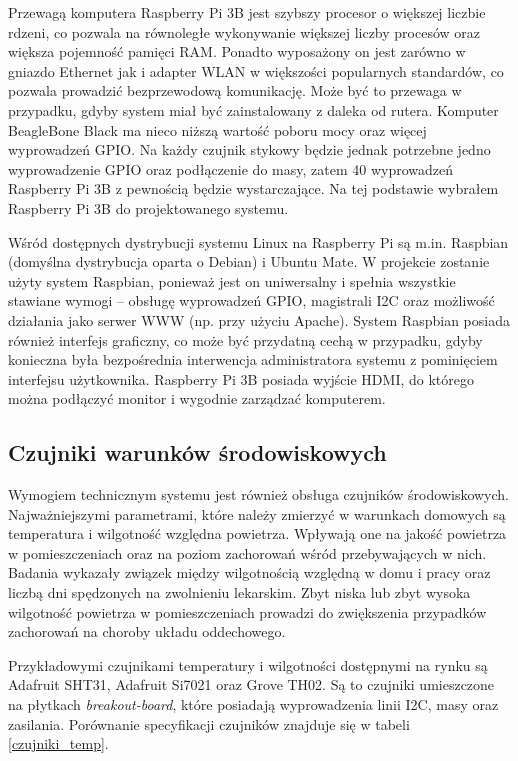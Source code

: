 \documentclass[a4paper,12pt,twoside]{article}
\begin{document}
Przewagą komputera Raspberry Pi 3B jest szybszy procesor o większej liczbie rdzeni, co pozwala na równoległe wykonywanie większej liczby procesów oraz większa pojemność pamięci RAM. Ponadto wyposażony on jest zarówno w gniazdo Ethernet jak i adapter WLAN w większości popularnych standardów, co pozwala prowadzić bezprzewodową komunikację. Może być to przewaga w przypadku, gdyby system miał być zainstalowany z daleka od rutera. Komputer BeagleBone Black ma nieco niższą wartość poboru mocy oraz więcej wyprowadzeń GPIO. Na każdy czujnik stykowy będzie jednak potrzebne jedno wyprowadzenie GPIO oraz podłączenie do masy, zatem 40 wyprowadzeń Raspberry Pi 3B z pewnością będzie wystarczające. Na tej podstawie wybrałem Raspberry Pi 3B do projektowanego systemu.

Wśród dostępnych dystrybucji systemu Linux na Raspberry Pi są m.in. Raspbian (domyślna dystrybucja oparta o Debian) i Ubuntu Mate. W projekcie zostanie użyty system Raspbian, ponieważ jest on uniwersalny i spełnia wszystkie stawiane wymogi -- obsługę wyprowadzeń GPIO, magistrali I2C oraz możliwość działania jako serwer WWW (np. przy użyciu Apache). System Raspbian posiada również interfejs graficzny, co może być przydatną cechą w przypadku, gdyby konieczna była bezpośrednia interwencja administratora systemu z pominięciem interfejsu użytkownika. Raspberry Pi 3B posiada wyjście HDMI, do którego można podłączyć monitor i wygodnie zarządzać komputerem.

\subsection{Czujniki warunków środowiskowych}
Wymogiem technicznym systemu jest również obsługa czujników środowiskowych. Najważniejszymi parametrami, które należy zmierzyć w warunkach domowych są temperatura i wilgotność względna powietrza. Wpływają one na jakość powietrza w pomieszczeniach oraz na poziom zachorowań wśród przebywających w nich. Badania wykazały związek między wilgotnością względną w domu i pracy oraz liczbą dni spędzonych na zwolnieniu lekarskim. Zbyt niska lub zbyt wysoka wilgotność powietrza w pomieszczeniach prowadzi do zwiększenia przypadków zachorowań na choroby układu oddechowego. \cite{zachorowania} 

Przykładowymi czujnikami temperatury i wilgotności dostępnymi na rynku są Adafruit SHT31, Adafruit Si7021 oraz Grove TH02. Są to czujniki umieszczone na płytkach \textit{breakout-board}, które posiadają wyprowadzenia linii I2C, masy oraz zasilania. Porównanie specyfikacji czujników znajduje się w tabeli \ref{czujniki_temp}.
\end{document}

